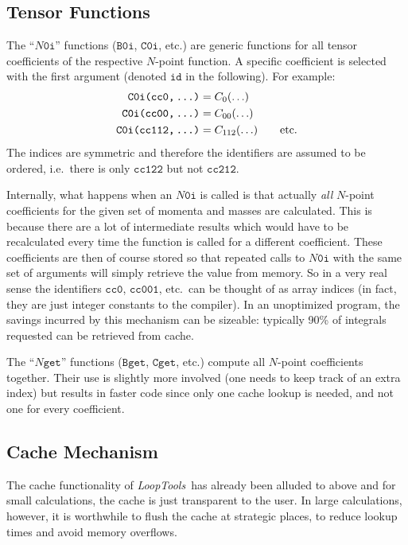 \documentclass[twoside,12pt]{report}
\let\dots\textellipsis
\def\LT{\textit{LoopTools}}
\def\ie{i.e.\ }
\def\Code#1{\ensuremath{\texttt{#1}}}
\begin{document}
\subsection{Tensor Functions}
%
%

The ``\Code{$N$0i}'' functions (\Code{B0i}, \Code{C0i}, etc.) are generic
functions for all tensor coefficients of the respective $N$-point 
function.  A specific coefficient is selected with the first argument
(denoted \Code{id} in the following).  For example:
$$
\begin{aligned}
\text{\Code{C0i(cc0,\,\dots)}} &= C_0(\ldots) \\
\text{\Code{C0i(cc00,\,\dots)}} &= C_{00}(\ldots) \\
\text{\Code{C0i(cc112,\,\dots)}} &= C_{112}(\ldots) \qquad \text{etc.}
\end{aligned}
$$
The indices are symmetric and therefore the identifiers are assumed to be
ordered, \ie there is only \Code{cc122} but not \Code{cc212}.

%
Internally, what happens when an \Code{$N$0i} is called is that actually
\textit{all} $N$-point coefficients for the given set of momenta and
masses are calculated.  This is because there are a lot of intermediate
results which would have to be recalculated every time the function is 
called for a different coefficient.  These coefficients are then of course 
stored so that repeated calls to \Code{$N$0i} with the same set of 
arguments will simply retrieve the value from memory.  So in a very real 
sense the identifiers \Code{cc0}, \Code{cc001}, etc.\ can be thought of 
as array indices (in fact, they are just integer constants to the compiler).  
In an unoptimized program, the savings incurred by this mechanism can be 
sizeable: typically 90\% of integrals requested can be retrieved from cache.

The ``\Code{$N$get}'' functions (\Code{Bget}, \Code{Cget}, etc.) compute
all $N$-point coefficients together.  Their use is slightly more involved
(one needs to keep track of an extra index) but results in faster code 
since only one cache lookup is needed, and not one for every coefficient.


\subsection{Cache Mechanism}
%
%
%

The cache functionality of \LT\ has already been alluded to above
and for small calculations, the cache is just transparent to the user.
In large calculations, however, it is worthwhile to flush the cache
at strategic places, to reduce lookup times and avoid memory overflows.
\end{document}
